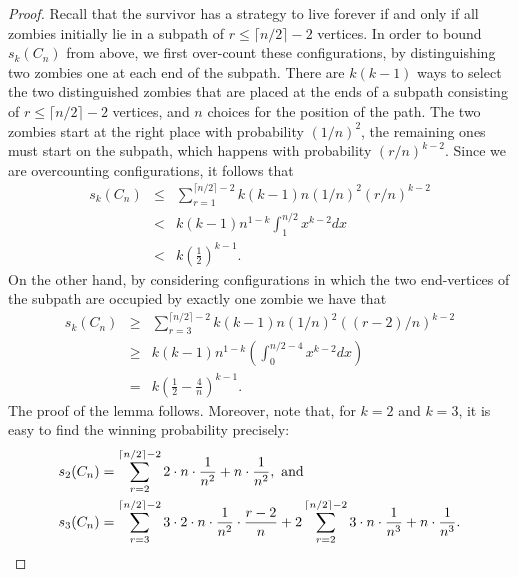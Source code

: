 \documentclass[12pt]{amsart}
\begin{document}
\begin{proof}
Recall that the survivor has a strategy to live forever if and only if all zombies initially lie in a subpath of $r \le \lceil n/2
\rceil -2$ vertices. In order to bound $s_k(C_n)$ from above, we first over-count these configurations, by distinguishing two zombies one at each end of the subpath.
There are $k(k-1)$ ways to select the two distinguished zombies that are placed at the ends of a subpath consisting of $r \le \lceil n/2
\rceil -2$ vertices, and $n$ choices for the position of the path. The two zombies start at the right place with probability $(1/n)^2$, the remaining ones must start on the subpath, which happens
with probability $(r/n)^{k-2}$. Since we are overcounting configurations, it follows that
\begin{eqnarray*}
s_k(C_n) &\le &\sum_{r=1}^{\lceil n/2 \rceil -2} k (k-1) n (1/n)^2 (r/n)^{k-2} \\
&< &k(k-1) n^{1-k} \int_1^{n/2} x^{k-2} dx \\&< &k \left( \frac 12 \right)^{k-1}.
\end{eqnarray*}
On the other hand, by considering configurations in which the two end-vertices of the subpath are occupied by exactly one zombie we have that
\begin{eqnarray*}
s_k(C_n) &\ge& \sum_{r=3}^{\lceil n/2 \rceil -2} k (k-1) n (1/n)^2 ((r-2)/n)^{k-2}\\
& \ge& k(k-1) n^{1-k} \left( \int_0^{n/2-4} x^{k-2} dx \right) \\
&= &k \left( \frac 12 - \frac {4}{n} \right)^{k-1}.
\end{eqnarray*}
The proof of the lemma follows. Moreover, note that,
for $k=2$ and $k=3$, it is easy to find the winning probability precisely:
\begin{align*}
s_2(C_n) &= \sum_{r=2}^{\lceil n/2 \rceil -2} 2\cdot n \cdot \frac {1}{n^2} + n \cdot \frac {1}{n^2}, \mbox{ and } \\
s_3(C_n) &= \sum_{r=3}^{\lceil n/2 \rceil -2} 3\cdot 2\cdot n \cdot \frac {1}{n^2} \cdot \frac {r-2}{n} + 2 \sum_{r=2}^{\lceil n/2 \rceil -2} 3\cdot n \cdot \frac {1}{n^3}  + n \cdot \frac {1}{n^3}. 
\qedhere
\end{align*}
\end{proof}
\end{document}
